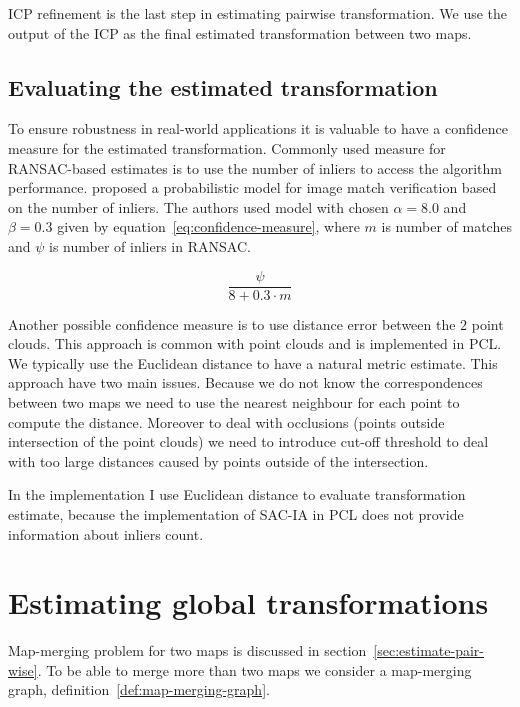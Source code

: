 \gls{ICP} refinement is the last step in estimating pairwise transformation. We use the output of the \gls{ICP} as the final estimated transformation between two maps.

\subsection{Evaluating the estimated transformation}
\label{sec:transform-evaluation}

To ensure robustness in real-world applications it is valuable to have a confidence measure for the estimated transformation. Commonly used measure for \gls{RANSAC}-based estimates is to use the number of inliers to access the algorithm performance. \citet{brown2007automatic} proposed a probabilistic model for image match verification based on the number of inliers. The authors used model with chosen $\alpha = 8.0$ and $\beta = 0.3$ given by equation~\eqref{eq:confidence-measure}, where $m$ is number of matches and $\psi$ is number of inliers in \gls{RANSAC}.

\begin{equation}
\label{eq:confidence-measure}
\frac{\psi}{8 + 0.3 \cdot m}
\end{equation}

Another possible confidence measure is to use distance error between the $2$ point clouds. This approach is common with point clouds and is implemented in \gls{PCL}. We typically use the Euclidean distance to have a natural metric estimate. This approach have two main issues. Because we do not know the correspondences between two maps we need to use the nearest neighbour for each point to compute the distance. Moreover to deal with occlusions (points outside intersection of the point clouds) we need to introduce cut-off threshold to deal with too large distances caused by points outside of the intersection.

In the implementation I use Euclidean distance to evaluate transformation estimate, because the implementation of \gls{SAC-IA} in \gls{PCL} does not provide information about inliers count.


\section{Estimating global transformations}
\label{sec:estimate-global}

Map-merging problem for two maps is discussed in section~\ref{sec:estimate-pair-wise}. To be able to merge more than two maps we consider a map-merging graph, definition~\ref{def:map-merging-graph}.

